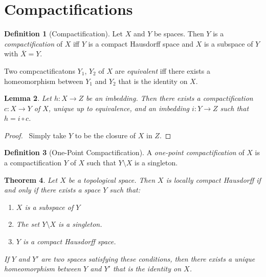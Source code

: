 \documentclass{report}
\let\qed\relax
\newtheorem{lm}{Lemma}[section]
\newtheorem{thm}[lm]{Theorem}
\theoremstyle{definition}
\newtheorem{df}[lm]{Definition}
\begin{document}
  \section{Compactifications}

  \begin{df}[Compactification]
    Let $X$ and $Y$ be spaces. Then $Y$ is a \emph{compactification} of $X$ iff
    $Y$ is a compact Hausdorff space and $X$ is a subspace of $Y$ with
    $\overline{X} = Y$.

    Two compcactificatons $Y_1$, $Y_2$ of $X$ are \emph{equivalent} iff there exists a homeomorphism between $Y_1$ and $Y_2$ that is the identity on $X$.
  \end{df}

  \begin{lm}
    \label{lm:topology:compactification:factorization}
    Let $h : X \rightarrow Z$ be an imbedding. Then there exists a compactification $c : X \rightarrow Y$ of $X$, unique up to equivalence,
    and an imbedding $i : Y \rightarrow Z$ such that $h = i \circ c$.
  \end{lm}

  \begin{proof}
    \pf\ Simply take $Y$ to be the closure of $X$ in $Z$. \qed
  \end{proof}

  \begin{df}[One-Point Compactification]
    A \emph{one-point compactification} of $X$ is a compactification $Y$ of $X$
    such that $Y \setminus X$ is a singleton.
  \end{df}

  \begin{thm}
    \label{thm:topology:locally_compact:one_point_compactification}
    Let $X$ be a topological space. Then $X$ is locally compact Hausdorff if
    and
    only if there exists a space $Y$ such that:
    \begin{enumerate}
      \item $X$ is a subspace of $Y$
      \item The set $Y \setminus X$ is a singleton.
      \item $Y$ is a compact Hausdorff space.
    \end{enumerate}
    If $Y$ and $Y'$ are two spaces satisfying these conditions, then there
    exists a
    unique homeomorphism between $Y$ and $Y'$ that is the identity on $X$.
  \end{thm}
\end{document}
